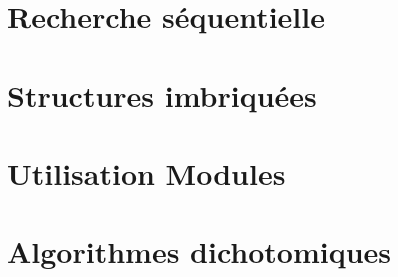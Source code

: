 \proffalse
\begin{multicols}{2}


\section{Recherche séquentielle}
\renewcommand{\repExo}{../../Informatique/S1_Themes/01_RechercheSequentielle}

\renewcommand{\td}{01_AlgorithmesBasiques}
\graphicspath{{\repStyle/png/}{\repExo/\td/images/}}


\renewcommand{\td}{02_Dictionnaires}
\graphicspath{{\repStyle/png/}{\repExo/\td/images/}}



\section{Structures imbriquées}
\renewcommand{\repExo}{../../Informatique/S1_Themes/02_StructuresImbriquees}

\renewcommand{\td}{01_RechercheDansTexte}
\graphicspath{{\repStyle/png/}{\repExo/\td/images/}}


\renewcommand{\td}{02_TriBulles}
\graphicspath{{\repStyle/png/}{\repExo/\td/images/}}



\section{Utilisation Modules}
\renewcommand{\repExo}{../../Informatique/S1_Themes/03_UtilisationModules}

\renewcommand{\td}{01_SurfingPorquerolles}
\graphicspath{{\repStyle/png/}{\repExo/\td/images/}}


\section{Algorithmes dichotomiques}
\renewcommand{\repExo}{../../Informatique/S1_Themes/04_AlgorithmesDichotomiques}

\renewcommand{\td}{01_RechercheDichotomique}
\graphicspath{{\repStyle/png/}{\repExo/\td/images/}}


\renewcommand{\td}{02_ExponentiationRapide}
\graphicspath{{\repStyle/png/}{\repExo/\td/images/}}



\end{multicols}
